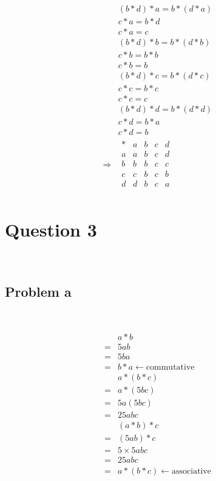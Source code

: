 \documentclass{article}
\begin{document}
\begin{equation*}
    \begin{split}
        &(b*d)*a=b*(d*a)\\
        &c*a=b*d\\
        &c*a=c\\
        &(b*d)*b=b*(d*b)\\
        &c*b=b*b\\
        &c*b=b\\
        &(b*d)*c=b*(d*c)\\
        &c*c=b*c\\
        &c*c=c\\
        &(b*d)*d=b*(d*d)\\
        &c*d=b*a\\
        &c*d=b\\
        \Rightarrow&\begin{array}{c|cccc}
            *&a&b&c&d\\
            \hline
            a&a&b&c&d\\
            b&b&b&c&c\\
            c&c&b&c&b\\
            d&d&b&c&a\\
        \end{array}
    \end{split}
\end{equation*}

\newpage

\section*{Question 3}

~

\subsection*{Problem a}

~

\begin{equation*}
    \begin{split}
        &a*b\\
        =&5ab\\
        =&5ba\\
        =&b*a\leftarrow\text{commutative}\\
        &a*(b*c)\\
        =&a*(5bc)\\
        =&5a(5bc)\\
        =&25abc\\
        &(a*b)*c\\
        =&(5ab)*c\\
        =&5\times5abc\\
        =&25abc\\
        =&a*(b*c)\leftarrow\text{associative}\\
    \end{split}
\end{equation*}
\end{document}
